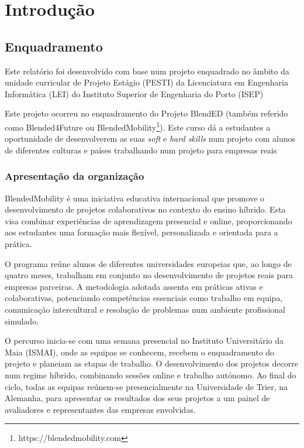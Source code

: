 \chapter{Introdução}
\label{chap:introducao}

\section{Enquadramento}
\label{sec:introducao_enquadramento}

Este relatório foi desenvolvido com base num projeto enquadrado no âmbito da unidade curricular de Projeto Estágio (PESTI) da Licenciatura em Engenharia Informática (LEI) do Instituto Superior de Engenharia do Porto (ISEP)

Este projeto ocorreu no enquadramento do Projeto BlendED (também referido como Blended4Future ou BlendedMobility\footnote{https://blendedmobility.com}). Este curso dá a estudantes a oportunidade de desenvolverem as suas \textit{soft} e \textit{hard skills} num projeto com alunos de diferentes culturas e países trabalhando num projeto para empresas reais

\subsection{Apresentação da organização}

BlendedMobility é uma iniciativa educativa internacional que promove o desenvolvimento de projetos colaborativos no contexto do ensino híbrido. Esta visa combinar experiências de aprendizagem presencial e online, proporcionando aos estudantes uma formação mais flexível, personalizada e orientada para a prática.

O programa reúne alunos de diferentes universidades europeias que, ao longo de quatro meses, trabalham em conjunto no desenvolvimento de projetos reais para empresas parceiras. A metodologia adotada assenta em práticas ativas e colaborativas, potenciando competências essenciais como trabalho em equipa, comunicação intercultural e resolução de problemas num ambiente profissional simulado.

O percurso inicia-se com uma semana presencial no Instituto Universitário da Maia (ISMAI), onde as equipas se conhecem, recebem o enquadramento do projeto e planeiam as etapas de trabalho. O desenvolvimento dos projetos decorre num regime híbrido, combinando sessões online e trabalho autónomo. Ao final do ciclo, todas as equipas reúnem-se presencialmente na Universidade de Trier, na Alemanha, para apresentar os resultados dos seus projetos a um painel de avaliadores e representantes das empresas envolvidas.


